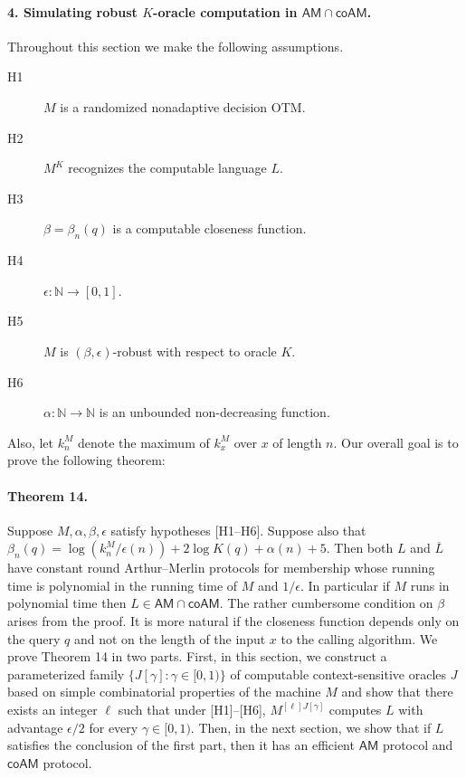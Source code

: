 \documentclass[10pt,a4paper]{article}
\begin{document}
\paragraph{4. Simulating robust $K$-oracle computation in $\mathsf{AM}\cap\mathsf{coAM}$.}
Throughout this section we make the following assumptions.
\begin{description}
\item[H1] $M$ is a randomized nonadaptive decision OTM.
\item[H2] $M^K$ recognizes the computable language $L$.
\item[H3] $\beta=\beta_n(q)$ is a computable closeness function.
\item[H4] $\epsilon:\mathbb N\to[0,1]$.
\item[H5] $M$ is $(\beta,\epsilon)$-robust with respect to oracle $K$.
\item[H6] $\alpha:\mathbb N\to\mathbb N$ is an unbounded non-decreasing function.
\end{description}
Also, let $k_n^M$ denote the maximum of $k_x^M$ over $x$ of length $n$.
Our overall goal is to prove the following theorem:
\paragraph{Theorem 14.}
Suppose $M,\alpha,\beta,\epsilon$ satisfy hypotheses [H1--H6]. Suppose also that $\beta_n(q)=\log(k_n^M/\epsilon(n))+2\log K(q)+\alpha(n)+5$. Then both $L$ and $\overline L$ have constant round Arthur--Merlin protocols for membership whose running time is polynomial in the running time of $M$ and $1/\epsilon$. In particular if $M$ runs in polynomial time then $L\in\mathsf{AM}\cap\mathsf{coAM}$.
The rather cumbersome condition on $\beta$ arises from the proof. It is more natural if the closeness function depends only on the query $q$ and not on the length of the input $x$ to the calling algorithm.
We prove Theorem 14 in two parts. First, in this section, we construct a parameterized family $\{J[\gamma]:\gamma\in[0,1)\}$ of computable context-sensitive oracles $J$ based on simple combinatorial properties of the machine $M$ and show that there exists an integer $\ell$ such that under [H1]--[H6], $M^{[\ell]J[\gamma]}$ computes $L$ with advantage $\epsilon/2$ for every $\gamma\in[0,1)$.
Then, in the next section, we show that if $L$ satisfies the conclusion of the first part, then it has an efficient $\mathsf{AM}$ protocol and $\mathsf{coAM}$ protocol.
\end{document}
